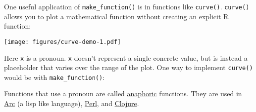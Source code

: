 One useful application of \texttt{make\_function()} is in functions like
\texttt{curve()}. \texttt{curve()} allows you to plot a mathematical
function without creating an explicit R function:

\begin{Shaded}
\begin{Highlighting}[]
\NormalTok{(}\NormalTok{(}\NormalTok{(} \NormalTok{*}\StringTok{ } \NormalTok{)}
\end{Highlighting}
\end{Shaded}

\texttt{[image: figures/curve-demo-1.pdf]}

Here \texttt{x} is a pronoun. \texttt{x} doesn't represent a single
concrete value, but is instead a placeholder that varies over the range
of the plot. One way to implement \texttt{curve()} would be with
\texttt{make\_function()}:

\begin{Shaded}
\begin{Highlighting}[]
\StringTok{ } \NormalTok{(}\NormalTok{, }\NormalTok{), } \NormalTok{, }
                    \NormalTok{()) \{}
  \StringTok{ }\NormalTok{(}\NormalTok{(} \NormalTok{), }

  \StringTok{ }\NormalTok{(xlim[}\NormalTok{], xlim[}\NormalTok{], } 
  \StringTok{ }

   \NormalTok{, } \NormalTok{(}
\NormalTok{\}}
\end{Highlighting}
\end{Shaded}

Functions that use a pronoun are called
\href{http://en.wikipedia.org/wiki/Anaphora_(linguistics)}{anaphoric}
functions. They are used in
\href{http://www.arcfn.com/doc/anaphoric.html}{Arc} (a lisp like
language),
\href{http://www.perlmonks.org/index.pl?node_id=666047}{Perl}, and
\href{http://amalloy.hubpages.com/hub/Unhygenic-anaphoric-Clojure-macros-for-fun-and-profit}{Clojure}.
 

